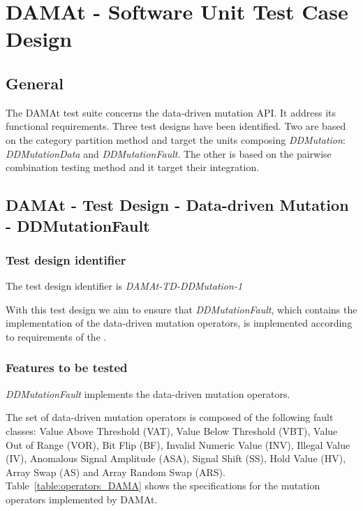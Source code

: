 
\chapter{DAMAt - Software Unit Test Case Design}
\label{chap:design_DAMAt}


\section{General}

The DAMAt test suite concerns the data-driven mutation API. It address its functional requirements. Three test designs have been identified. Two are based on the category partition method and target the units composing \emph{DDMutation}: \emph{DDMutationData} and \emph{DDMutationFault}.
The other is based on the pairwise combination testing method and it target their integration.

\section{DAMAt - Test Design - Data-driven Mutation - DDMutationFault}

\subsection{Test design identifier}

The test design identifier is \emph{DAMAt-TD-DDMutation-1}

With this test design we aim to ensure that \emph{DDMutationFault}, which contains the implementation of the data-driven mutation operators, is implemented according to requirements of the \FAQAS.

\subsection{Features to be tested}

\emph{DDMutationFault} implements the data-driven mutation operators.

The set of data-driven mutation operators  is composed of the following fault classes: Value Above Threshold (VAT), Value Below Threshold (VBT), Value Out of Range (VOR), Bit Flip (BF), Invalid Numeric Value (INV), Illegal Value (IV), Anomalous Signal Amplitude (ASA), Signal Shift (SS), Hold Value (HV), Array Swap (AS) and Array Random Swap (ARS).
Table~\ref{table:operators_DAMA} shows the specifications for the mutation operators implemented by DAMAt.

